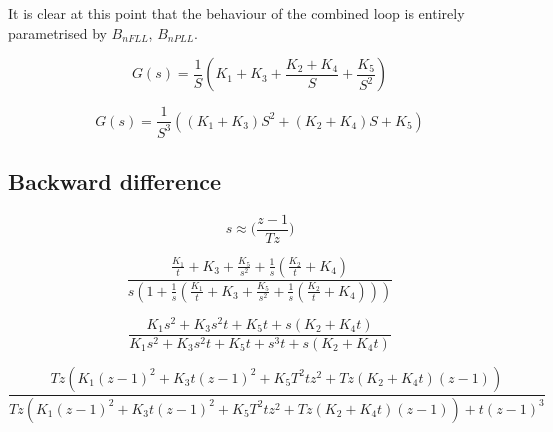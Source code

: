 It is clear at this point that the behaviour of the combined loop is entirely parametrised by $B_{nFLL}$,  $B_{nPLL}$.

\begin{equation}
G(s) = \frac{1}{S}(K_1 + K_3 + \frac{K_2 + K_4}{S} + \frac{K_5}{S^2})
\end{equation}

\begin{equation}
G(s) = \frac{1}{S^3}((K_1 + K_3)S^2 + (K_2 + K_4)S + K_5)
\end{equation}




\subsection{Backward difference}

\begin{equation}
s \approx \Big(\frac{z-1}{Tz}\Big)
\end{equation}

\begin{comment}
\begin{equation}
 H(s) = \frac{s^2(K1) + s(K2) + K3}
 {s^3+ s^2(K1)+ s(K2) + K3}
\end{equation}

\begin{equation}
 H(s) = \frac{\Big(\frac{z-1}{Tz}\Big)^2(K1) + \Big(\frac{z-1}{Tz}\Big)(K2) + K3}{\Big(\frac{z-1}{Tz}\Big)^3+ \Big(\frac{z-1}{Tz}\Big)^2(K1)+ \Big(\frac{z-1}{Tz}\Big)(K2) + K3}
\end{equation}
\end{comment}

\begin{equation}
\frac{\frac{K_{1}}{t} + K_{3} + \frac{K_{5}}{s^{2}} + \frac{1}{s} \left(\frac{K_{2}}{t} + K_{4}\right)}{s \left(1 + \frac{1}{s} \left(\frac{K_{1}}{t} + K_{3} + \frac{K_{5}}{s^{2}} + \frac{1}{s} \left(\frac{K_{2}}{t} + K_{4}\right)\right)\right)}
\end{equation}

\begin{equation}
\frac{K_{1} s^{2} + K_{3} s^{2} t + K_{5} t + s \left(K_{2} + K_{4} t\right)}{K_{1} s^{2} + K_{3} s^{2} t + K_{5} t + s^{3} t + s \left(K_{2} + K_{4} t\right)}
\end{equation}

\begin{equation}
\frac{T z \left(K_{1} \left(z - 1\right)^{2} + K_{3} t \left(z - 1\right)^{2} + K_{5} T^{2} t z^{2} + T z \left(K_{2} + K_{4} t\right) \left(z - 1\right)\right)}{T z \left(K_{1} \left(z - 1\right)^{2} + K_{3} t \left(z - 1\right)^{2} + K_{5} T^{2} t z^{2} + T z \left(K_{2} + K_{4} t\right) \left(z - 1\right)\right) + t \left(z - 1\right)^{3}}
\end{equation}

